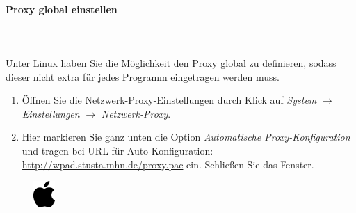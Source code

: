\documentclass[a4paper,12pt]{scrartcl}
\begin{document}
\paragraph*{Proxy global einstellen} ~\\
\\
Unter Linux haben Sie die Möglichkeit den Proxy global zu definieren, sodass dieser nicht extra für jedes Programm eingetragen werden muss.
\begin{enumerate}
	\item Öffnen Sie die Netzwerk-Proxy-Einstellungen durch Klick auf \emph{System} $\rightarrow$ \emph{Einstellungen} $\rightarrow$ \emph{Netzwerk-Proxy}.
	\item Hier markieren Sie ganz unten die Option \emph{Automatische Proxy-Konfiguration} und tragen bei URL für Auto-Konfiguration: \url{http://wpad.stusta.mhn.de/proxy.pac} ein. Schließen Sie das Fenster. 
\end{enumerate}



\newpage
\enlargethispage{20pt}



\begin{figure}[t!]
	\raggedleft
	\vspace{-20pt}
	\includegraphics[height=1cm,keepaspectratio]{Bilder/apple_logo_neu}
	\vspace{-30pt}
\end{figure}
\end{document}
